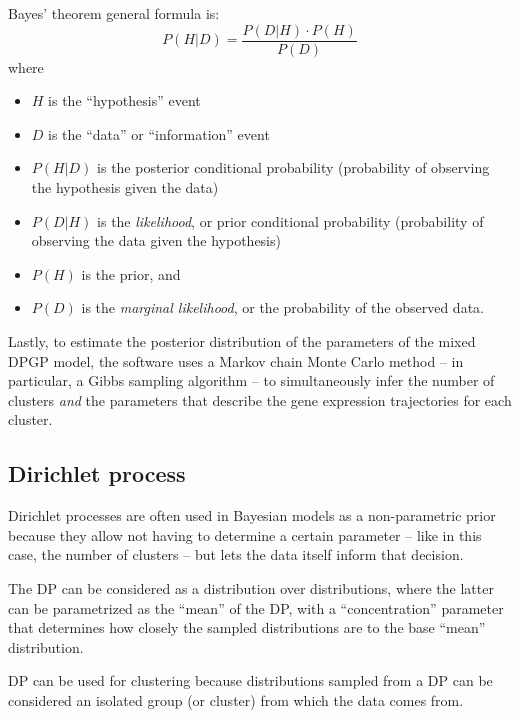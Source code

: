 Bayes' theorem general formula is:
\begin{displaymath}
    P(H|D) = \frac{P(D|H) \cdot P(H)}{P(D)}
\end{displaymath}
where
\begin{itemize}
    \item $H$ is the ``hypothesis'' event
    \item $D$ is the ``data'' or ``information'' event
    \item $P(H|D)$ is the posterior conditional probability (probability of observing the hypothesis given the data)
    \item $P(D|H)$ is the \emph{likelihood}, or prior conditional probability (probability of observing the data given the hypothesis)
    \item $P(H)$ is the prior, and
    \item $P(D)$ is the \emph{marginal likelihood}, or the probability of the observed data.
\end{itemize}

Lastly, to estimate the posterior distribution of the parameters of the mixed DPGP model, the software uses a Markov chain Monte Carlo method -- in particular, a Gibbs sampling algorithm -- to simultaneously infer the number of clusters \emph{and} the parameters that describe the gene expression trajectories for each cluster.

\subsection{Dirichlet process}
Dirichlet processes are often used in Bayesian models as a non-parametric prior because they allow not having to determine a certain parameter -- like in this case, the number of clusters -- but lets the data itself inform that decision.

The DP can be considered as a distribution over distributions, where the latter can be parametrized as the ``mean'' of the DP, with a ``concentration'' parameter that determines how closely the sampled distributions are to the base ``mean'' distribution.

DP can be used for clustering because distributions sampled from a DP can be considered an isolated group (or cluster) from which the data comes from.

